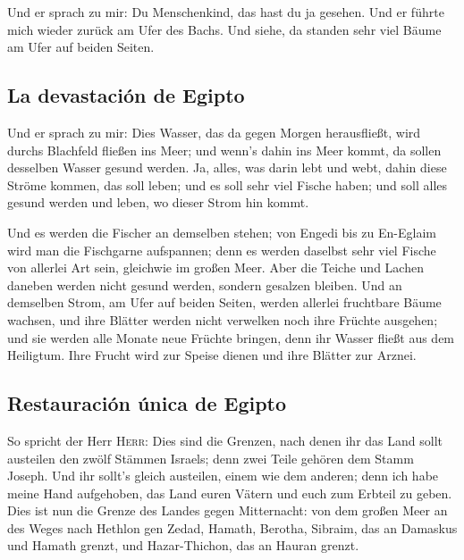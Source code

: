  Und er sprach zu mir: Du Menschenkind, das hast du ja
gesehen. Und er führte mich wieder zurück am Ufer des Bachs.
 Und siehe, da standen sehr viel Bäume am Ufer auf beiden
Seiten.

\hypertarget{la-devastaciuxf3n-de-egipto}{%
\subsection{La devastación de
Egipto}\label{la-devastaciuxf3n-de-egipto}}

 Und er sprach zu mir: Dies Wasser, das da gegen Morgen
herausfließt, wird durchs Blachfeld fließen ins Meer; und wenn's dahin
ins Meer kommt, da sollen desselben Wasser gesund werden. 
Ja, alles, was darin lebt und webt, dahin diese Ströme kommen, das soll
leben; und es soll sehr viel Fische haben; und soll alles gesund werden
und leben, wo dieser Strom hin kommt.

 Und es werden die Fischer an demselben stehen; von
Engedi bis zu En-Eglaim wird man die Fischgarne aufspannen; denn es
werden daselbst sehr viel Fische von allerlei Art sein, gleichwie im
großen Meer.  Aber die Teiche und Lachen daneben werden
nicht gesund werden, sondern gesalzen bleiben.  Und an
demselben Strom, am Ufer auf beiden Seiten, werden allerlei fruchtbare
Bäume wachsen, und ihre Blätter werden nicht verwelken noch ihre Früchte
ausgehen; und sie werden alle Monate neue Früchte bringen, denn ihr
Wasser fließt aus dem Heiligtum. Ihre Frucht wird zur Speise dienen und
ihre Blätter zur Arznei.

\hypertarget{restauraciuxf3n-uxfanica-de-egipto}{%
\subsection{Restauración única de
Egipto}\label{restauraciuxf3n-uxfanica-de-egipto}}

 So spricht der Herr \textsc{Herr}: Dies sind die
Grenzen, nach denen ihr das Land sollt austeilen den zwölf Stämmen
Israels; denn zwei Teile gehören dem Stamm Joseph.  Und
ihr sollt's gleich austeilen, einem wie dem anderen; denn ich habe meine
Hand aufgehoben, das Land euren Vätern und euch zum Erbteil zu geben.
 Dies ist nun die Grenze des Landes gegen Mitternacht:
von dem großen Meer an des Weges nach Hethlon gen Zedad, 
Hamath, Berotha, Sibraim, das an Damaskus und Hamath grenzt, und
Hazar-Thichon, das an Hauran grenzt.

